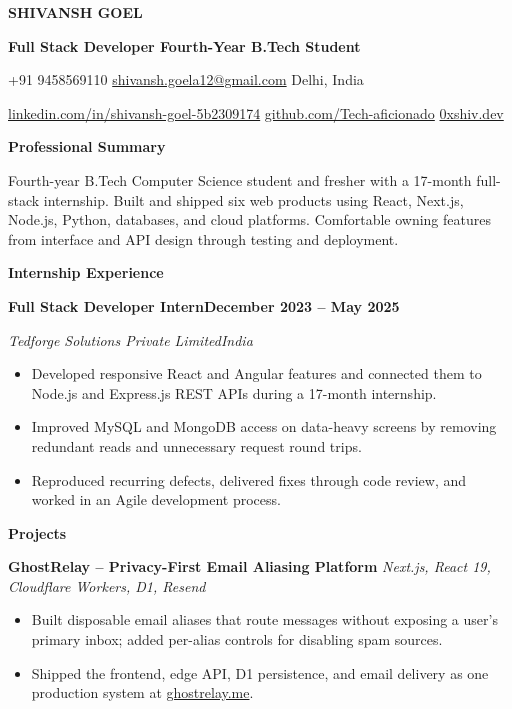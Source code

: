 \documentclass[11pt,a4paper]{article}
\newcommand{\sectiongap}{\vspace{4pt plus 6pt}}
\newcommand{\sectiontitle}[1]{%
  \sectiongap
  {\large\bfseries #1}\par
  \vspace{2pt}{\color{rulecolor}\hrule height 0.5pt}\vspace{4pt}
}
\newcommand{\entry}[4]{%
  \textbf{#1}\hfill\textbf{#2}\par
  \textit{#3}\hfill\textit{#4}\par
  \vspace{1pt}
}
\newcommand{\project}[2]{%
  \vspace{3pt}
  \textbf{#1} \textbar{} \textit{#2}\par
}
\begin{document}
\begin{center}
  {\fontsize{25}{28}\selectfont\bfseries SHIVANSH GOEL}\par
  \vspace{3pt}
  {\large\bfseries Full Stack Developer \textbar{} Fourth-Year B.Tech Student}\par
  \vspace{6pt}
  {\small
    +91 9458569110 \quad\textbar\quad
    \href{mailto:shivansh.goela12@gmail.com}{shivansh.goela12@gmail.com} \quad\textbar\quad
    Delhi, India
  }\par
  \vspace{2pt}
  {\small
    \href{https://www.linkedin.com/in/shivansh-goel-5b2309174}{linkedin.com/in/shivansh-goel-5b2309174}
    \quad\textbar\quad
    \href{https://github.com/Tech-aficionado}{github.com/Tech-aficionado}
    \quad\textbar\quad
    \href{https://0xshiv.dev}{0xshiv.dev}
  }
\end{center}

\sectiontitle{Professional Summary}
Fourth-year B.Tech Computer Science student and fresher with a 17-month full-stack internship. Built and shipped six web products using React, Next.js, Node.js, Python, databases, and cloud platforms. Comfortable owning features from interface and API design through testing and deployment.

\sectiontitle{Internship Experience}
\entry{Full Stack Developer Intern}{December 2023 -- May 2025}{Tedforge Solutions Private Limited}{India}
\begin{itemize}
  \item Developed responsive React and Angular features and connected them to Node.js and Express.js REST APIs during a 17-month internship.
  \item Improved MySQL and MongoDB access on data-heavy screens by removing redundant reads and unnecessary request round trips.
  \item Reproduced recurring defects, delivered fixes through code review, and worked in an Agile development process.
\end{itemize}

\sectiontitle{Projects}
\project{GhostRelay -- Privacy-First Email Aliasing Platform}{Next.js, React 19, Cloudflare Workers, D1, Resend}
\begin{itemize}
  \item Built disposable email aliases that route messages without exposing a user's primary inbox; added per-alias controls for disabling spam sources.
  \item Shipped the frontend, edge API, D1 persistence, and email delivery as one production system at \href{https://ghostrelay.me}{ghostrelay.me}.
\end{itemize}
\end{document}
